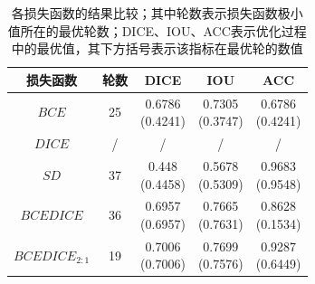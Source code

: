 \documentclass[letterpaper, 10pt, conference, twoside]{ieeeconf}
\begin{document}
\begin{table}[htbp]
  \centering
  \caption{各损失函数的结果比较；其中轮数表示损失函数极小值所在的最优轮数；DICE、IOU、ACC表示优化过程中的最优值，其下方括号表示该指标在最优轮的数值}
  \label{tab:table6}
  \begin{tabular}{ccccc}
    \toprule
    损失函数&轮数&DICE&IOU&ACC \\
    \midrule
      $BCE$&25&\makecell[c]{0.6786 \\(0.4241)}&\makecell[c]{0.7305 \\ (0.3747)}&\makecell[c]{0.6786 \\ (0.4241)} \\
    \midrule
      $DICE$&/&/&/&/ \\
    \midrule
      $SD$&37&\makecell[c]{0.448\\(0.4458)}&\makecell[c]{0.5678\\(0.5309)}&\makecell[c]{0.9683\\(0.9548)} \\
    \midrule
      $BCEDICE$&36&\makecell[c]{0.6957\\(0.6957)}&\makecell[c]{0.7665\\(0.7631)}&\makecell[c]{0.8628\\(0.1534)} \\
    \midrule
      $BCEDICE_{2:1}$&19&\makecell[c]{0.7006\\(0.7006)}&\makecell[c]{0.7699\\(0.7576)}&\makecell[c]{0.9287\\(0.6449)} \\
    \bottomrule
   \end{tabular}
\end{table}
\end{document}
